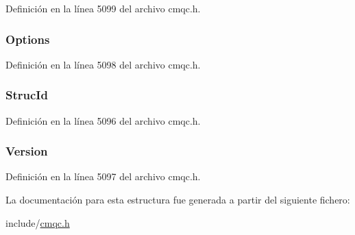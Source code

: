 Definición en la línea 5099 del archivo cmqc.\+h.

\hypertarget{structtag_m_q_s_r_o_ad7aff2d6c6044809464380998d24ec5c}{}
\subsubsection[{Options}]{ Options}\label{structtag_m_q_s_r_o_ad7aff2d6c6044809464380998d24ec5c}


Definición en la línea 5098 del archivo cmqc.\+h.

\hypertarget{structtag_m_q_s_r_o_a0530922ca944569b52601d74941f96e4}{}
\subsubsection[{Struc\+Id}]{ Struc\+Id}\label{structtag_m_q_s_r_o_a0530922ca944569b52601d74941f96e4}


Definición en la línea 5096 del archivo cmqc.\+h.

\hypertarget{structtag_m_q_s_r_o_a0656ef8f766b3907d394d88a35d7b7e9}{}
\subsubsection[{Version}]{ Version}\label{structtag_m_q_s_r_o_a0656ef8f766b3907d394d88a35d7b7e9}


Definición en la línea 5097 del archivo cmqc.\+h.



La documentación para esta estructura fue generada a partir del siguiente fichero\+:\begin{DoxyCompactItemize}
\item 
include/\hyperlink{cmqc_8h}{cmqc.\+h}\end{DoxyCompactItemize}
